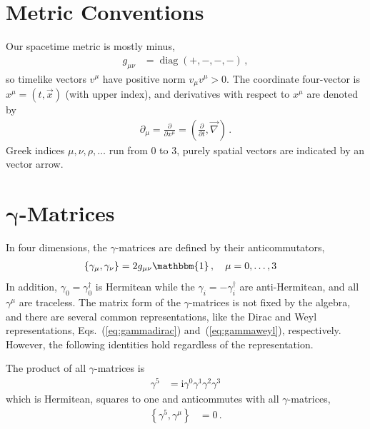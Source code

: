 \documentclass[12pt]{report}
\DeclareMathOperator{\diag}{diag}
\renewcommand{\i}{\ensuremath{\text{i}}}
\newcommand{\2}{\ensuremath{\sqrt{2}\,}}
\begin{document}
{    \section{Metric Conventions}
      Our spacetime metric is mostly minus,
      \begin{align}
        g_{\mu\nu}&=\diag\!\left(+,-,-,-\right)\,,
      \end{align}
      so timelike vectors $v^\mu$ have positive norm $v_\mu v^\mu>0$. The coordinate four-vector is
      $x^\mu=\left(t,\vec{x}\right)$ (with upper index), and derivatives with respect to $x^\mu$ are
      denoted by 
      \begin{align}
        \partial_\mu =\frac{\partial}{\partial x^\mu}=\left(\frac{\partial}{\partial
            t},\vec{\nabla}\right)\,. 
      \end{align}
      Greek indices $\mu,\nu,\rho,\ldots$ run from 0 to 3, purely spatial vectors are indicated by
      an vector arrow. 

    \section[$\gamma$-Matrices]{$\boldsymbol \gamma$-Matrices}
      In four dimensions, the $\gamma$-matrices are defined by their anticommutators,
      \begin{align}
        \left\{\gamma_\mu,\gamma_\nu\right\} &= 2g_{\mu\nu} \mathbbm{1}\,,\quad \mu=0,\ldots,3
      \end{align}
      In addition, $\gamma_0=\gamma_0^\dagger$ is Hermitean while the $\gamma_i=-\gamma_i^\dagger$ are
      anti-Hermitean, and all $\gamma^\mu$ are traceless. The matrix form of the $\gamma$-matrices
      is not fixed by the algebra, and there  
      are several common representations, like the Dirac and Weyl representations,
      Eqs.~(\ref{eq:gammadirac}) and~(\ref{eq:gammaweyl}), respectively. However, the following
      identities hold regardless of the representation.
      
      The product of all $\gamma$-matrices is
      \begin{align}
        \gamma^5 &= \i \gamma^0 \gamma^1 \gamma^2 \gamma^3
      \end{align}
      which is Hermitean, squares to one and anticommutes with all $\gamma$-matrices,
      \begin{align}
        \left\{ \gamma^5,\gamma^\mu\right\} &=0\,.
      \end{align}
      
}
\end{document}
